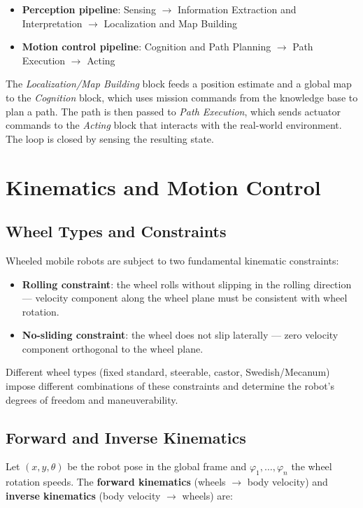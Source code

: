 \documentclass[11pt,a4paper]{article}
\theoremstyle{definition}
\theoremstyle{plain}
\theoremstyle{remark}
\begin{document}
\begin{itemize}
    \item \textbf{Perception pipeline}: Sensing $\to$ Information Extraction and Interpretation $\to$ Localization and Map Building
    \item \textbf{Motion control pipeline}: Cognition and Path Planning $\to$ Path Execution $\to$ Acting
\end{itemize}

The \textit{Localization/Map Building} block feeds a position estimate and a global map to the \textit{Cognition} block, which uses mission commands from the knowledge base to plan a path. The path is then passed to \textit{Path Execution}, which sends actuator commands to the \textit{Acting} block that interacts with the real-world environment. The loop is closed by sensing the resulting state.

\section{Kinematics and Motion Control}

\subsection{Wheel Types and Constraints}

Wheeled mobile robots are subject to two fundamental kinematic constraints:

\begin{itemize}
    \item \textbf{Rolling constraint}: the wheel rolls without slipping in the rolling direction — velocity component along the wheel plane must be consistent with wheel rotation.
    \item \textbf{No-sliding constraint}: the wheel does not slip laterally — zero velocity component orthogonal to the wheel plane.
\end{itemize}

Different wheel types (fixed standard, steerable, castor, Swedish/Mecanum) impose different combinations of these constraints and determine the robot's degrees of freedom and maneuverability.

\subsection{Forward and Inverse Kinematics}

Let $(x, y, \theta)$ be the robot pose in the global frame and $\varphi_1, \ldots, \varphi_n$ the wheel rotation speeds. The \textbf{forward kinematics} (wheels $\to$ body velocity) and \textbf{inverse kinematics} (body velocity $\to$ wheels) are:
\end{document}

